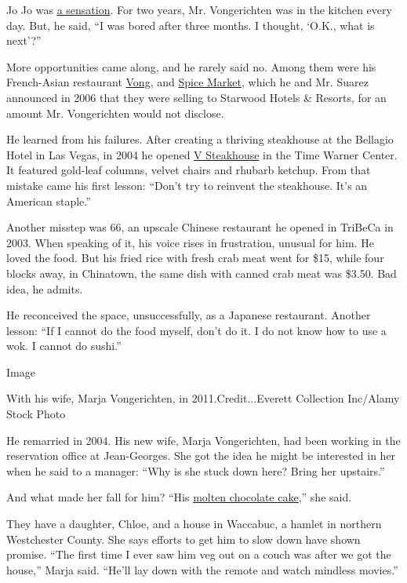 Jo Jo was
\href{https://www.nytimes3xbfgragh.onion/1991/07/12/arts/restaurants-737091.html}{a
sensation}. For two years, Mr. Vongerichten was in the kitchen every
day. But, he said, ``I was bored after three months. I thought, `O.K.,
what is next'?''

More opportunities came along, and he rarely said no. Among them were
his French-Asian restaurant
\href{https://www.nytimes3xbfgragh.onion/2006/08/16/dining/reviews/16rest.html}{Vong},
and
\href{https://www.nytimes3xbfgragh.onion/2004/03/24/dining/restaurants-fancy-street-food-but-what-a-street.html}{Spice
Market}, which he and Mr. Suarez announced in 2006 that they were
selling to Starwood Hotels \& Resorts, for an amount Mr. Vongerichten
would not disclose.

He learned from his failures. After creating a thriving steakhouse at
the Bellagio Hotel in Las Vegas, in 2004 he opened
\href{https://www.nytimes3xbfgragh.onion/2004/07/14/dining/restaurants-elaborate-dishes-assembly-required.html}{V
Steakhouse} in the Time Warner Center. It featured gold-leaf columns,
velvet chairs and rhubarb ketchup. From that mistake came his first
lesson: ``Don't try to reinvent the steakhouse. It's an American
staple.''

Another misstep was 66, an upscale Chinese restaurant he opened in
TriBeCa in 2003. When speaking of it, his voice rises in frustration,
unusual for him. He loved the food. But his fried rice with fresh crab
meat went for \$15, while four blocks away, in Chinatown, the same dish
with canned crab meat was \$3.50. Bad idea, he admits.

He reconceived the space, unsuccessfully, as a Japanese restaurant.
Another lesson: ``If I cannot do the food myself, don't do it. I do not
know how to use a wok. I cannot do sushi.''

Image

With his wife, Marja Vongerichten, in 2011.Credit...Everett Collection
Inc/Alamy Stock Photo

He remarried in 2004. His new wife, Marja Vongerichten, had been working
in the reservation office at Jean-Georges. She got the idea he might be
interested in her when he said to a manager: ``Why is she stuck down
here? Bring her upstairs.''

And what made her fall for him? ``His
\href{https://cooking.nytimes3xbfgragh.onion/recipes/1014719-molten-chocolate-cake}{molten
chocolate cake},'' she said.

They have a daughter, Chloe, and a house in Waccabuc, a hamlet in
northern Westchester County. She says efforts to get him to slow down
have shown promise. ``The first time I ever saw him veg out on a couch
was after we got the house,'' Marja said. ``He'll lay down with the
remote and watch mindless movies.''

